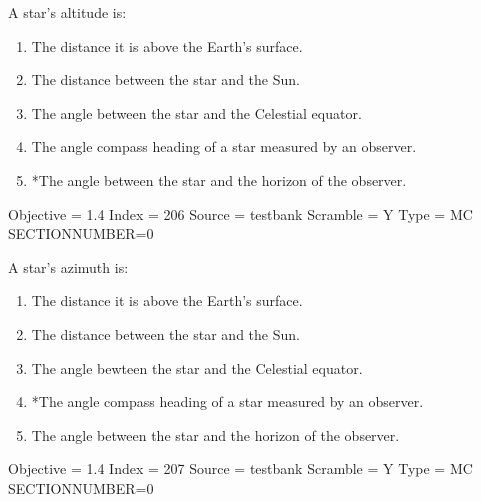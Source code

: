 \documentclass[11pt]{article}
\begin{document}
\begin{enumerate}
\begin{minipage}{\textwidth}
\begin{minipage}{\textwidth}
\item A star's altitude is:
\begin{enumerate} 
\setlength{\itemsep}{1pt} 
\setlength{\parskip}{0pt} 
\setlength{\parsep}{0pt}
\setlength{\multicolsep}{1pt} 
\item The distance it is above the Earth's surface.
\item The distance between the star and the Sun.
\item The angle between the star and the Celestial equator.
\item The angle compass heading of a star measured by an observer.
\item *The angle between the star and the horizon of the observer.
\end{enumerate} 
Objective = 1.4
Index = 206
Source = testbank
Scramble = Y
Type = MC
SECTIONNUMBER=0
\end{minipage}
\end{minipage}
\vskip 0.20in

\begin{minipage}{\textwidth}
\begin{minipage}{\textwidth}
\item A star's azimuth is:
\begin{enumerate} 
\setlength{\itemsep}{1pt} 
\setlength{\parskip}{0pt} 
\setlength{\parsep}{0pt}
\setlength{\multicolsep}{1pt} 
\item The distance it is above the Earth's surface.
\item The distance between the star and the Sun.
\item The angle bewteen the star and the Celestial equator.
\item *The angle compass heading of a star measured by an observer.
\item The angle between the star and the horizon of the observer.
\end{enumerate} 
Objective = 1.4
Index = 207
Source = testbank
Scramble = Y
Type = MC
SECTIONNUMBER=0
\end{minipage}
\end{minipage}
\vskip 0.20in


\end{enumerate}
\end{document}
